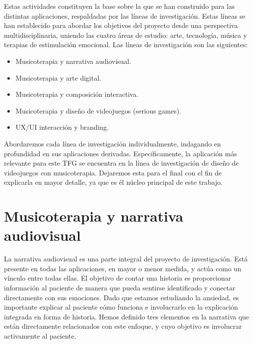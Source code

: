 Estas actividades constituyen la base sobre la que se han construido para las distintas aplicaciones, respaldadas por las líneas de investigación. Estas líneas se han establecido para abordar los objetivos del proyecto desde una perspectiva multidisciplinaria, uniendo las cuatro áreas de estudio: arte, tecnología, música y terapias de estimulación emocional. Las líneas de investigación son las siguientes:

\begin{itemize}
	\item Musicoterapia y narrativa audiovisual.
	\item Musicoterapia y arte digital.
	\item Musicoterapia y composición interactiva.
	\item Musicoterapia y diseño de videojuegos (serious games).
	\item UX/UI interacción y branding.
\end{itemize}

Abordaremos cada línea de investigación individualmente, indagando en profundidad en sus aplicaciones derivadas. Específicamente, la aplicación más relevante para este TFG se encuentra en la línea de investigación de diseño de videojuegos con musicoterapia. Dejaremos esta para el final con el fin de explicarla en mayor detalle, ya que es él núcleo principal de este trabajo.

\section{Musicoterapia y narrativa audiovisual}

La narrativa audiovisual es una parte integral del proyecto de investigación. Está presente en todas las aplicaciones, en mayor o menor medida, y actúa como un vínculo entre todas ellas. El objetivo de contar una historia es proporcionar información al paciente de manera que pueda sentirse identificado y conectar directamente con sus emociones. Dado que estamos estudiando la ansiedad, es importante explicar al paciente cómo funciona e involucrarlo en la explicación integrada en forma de historia. Hemos definido tres elementos en la narrativa que están directamente relacionados con este enfoque, y cuyo objetivo es involucrar activamente al paciente.

